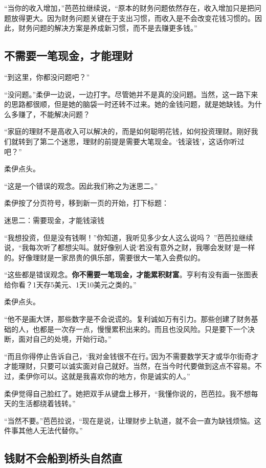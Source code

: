 “当你的收入增加，”芭芭拉继续说，“原本的财务问题依然存在，收入增加只是把问题放得更大。因为财务问题关键在于支出习惯，而收入是不会改变花钱习惯的。因此，财务问题的解决方案是养成新习惯，而不是去赚更多钱。”

\subsection{不需要一笔现金，才能理财}

“到这里，你都没问题吧？”

“没问题。”柔伊一边说，一边打字。尽管她并不是真的没问题。当然，这一路下来的思路都很顺，但是她的脑袋一时还转不过来。她的金钱问题，就是她缺钱。为什么多赚了，不能解决问题？

“家庭的理财不是高收入可以解决的，而是如何聪明花钱，如何投资理财。刚好我们就转到了第二个迷思，理财的前提是需要大笔现金。‘钱滚钱’，这话你听过吧？”

柔伊点头。

“这是一个错误的观念。因此我们称之为迷思二。”

柔伊按了分页符号，移到新一页的开始，打下标题：

{\kaishu 迷思二：需要现金，才能钱滚钱}

“我想投资，但是没有钱啊！”你知道，我听见多少女人这么说吗？ ”芭芭拉继续说，“我每次听了都想尖叫。就好像别人说‘若没有意外之财，我哪会发财’是一样的。好像理财是一家昂贵的俱乐部，需要很大一笔入会费似的。

“这些都是错误观念。\textbf{你不需要一笔现金，才能累积财富}。亨利有没有画一张图表给你看？1天存5美元、1天10美元之类的。”

柔伊点头。

“他不是画大饼，那些数字是不会说谎的。复利诚如万有引力。那些创建了财务基础的人，也都是一次存一点，慢慢累积出来的。而且也没风险。只是要下一个决断，面对自己的处境，开始行动。”

“而且你得停止告诉自己，‘我对金钱很不在行。’因为不需要数学天才或华尔街奇才才能理财，只要可以诚实面对自己就好。当然，在当今时代要做到这点不容易。不过，柔伊你可以。这就是我喜欢你的地方，你是诚实的人。”

柔伊觉得自己脸红了。她把双手从键盘上移开，“我懂你说的，芭芭拉。我不想每天的生活都绕着钱转。”

“当然不要。”芭芭拉说，“现在是说，让理财步上轨道，就不会一直为缺钱烦恼。这件事其他人无法代替你。”

\subsection{钱财不会船到桥头自然直}

